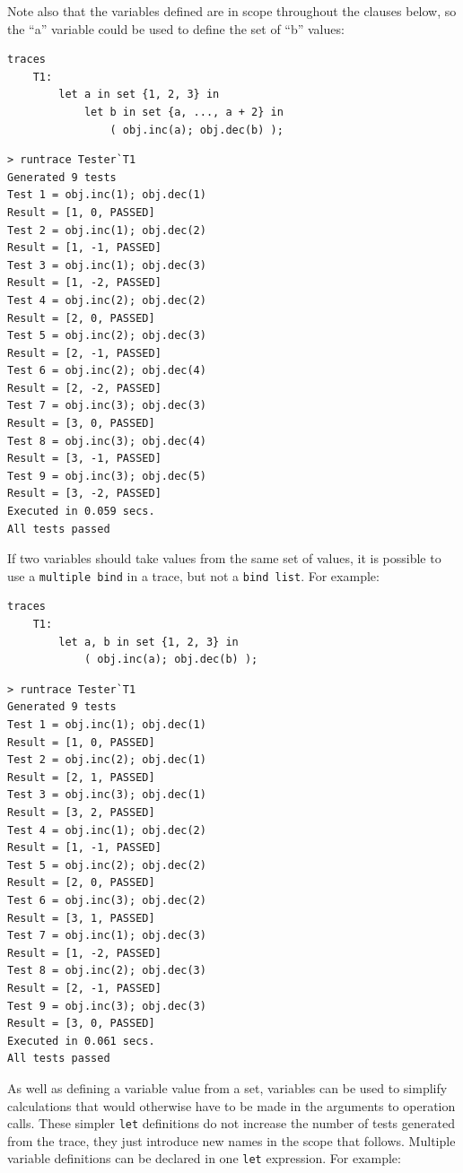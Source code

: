 \documentclass{overturerepchap}
\begin{document}
Note also that the variables defined are in scope
throughout the clauses below, so the ``a'' variable could be used to define the
set of ``b'' values:

\small
\begin{lstlisting}
traces
    T1:
        let a in set {1, 2, 3} in
            let b in set {a, ..., a + 2} in
                ( obj.inc(a); obj.dec(b) );
\end{lstlisting}

\begin{verbatim}
> runtrace Tester`T1
Generated 9 tests
Test 1 = obj.inc(1); obj.dec(1)
Result = [1, 0, PASSED]
Test 2 = obj.inc(1); obj.dec(2)
Result = [1, -1, PASSED]
Test 3 = obj.inc(1); obj.dec(3)
Result = [1, -2, PASSED]
Test 4 = obj.inc(2); obj.dec(2)
Result = [2, 0, PASSED]
Test 5 = obj.inc(2); obj.dec(3)
Result = [2, -1, PASSED]
Test 6 = obj.inc(2); obj.dec(4)
Result = [2, -2, PASSED]
Test 7 = obj.inc(3); obj.dec(3)
Result = [3, 0, PASSED]
Test 8 = obj.inc(3); obj.dec(4)
Result = [3, -1, PASSED]
Test 9 = obj.inc(3); obj.dec(5)
Result = [3, -2, PASSED]
Executed in 0.059 secs. 
All tests passed
\end{verbatim}
\normalsize

If two variables should take values from the same set of values, it is possible
to use a \texttt{multiple bind} in a trace, but not a \texttt{bind list}. For
example:

\small
\begin{lstlisting}
traces
    T1:
        let a, b in set {1, 2, 3} in
            ( obj.inc(a); obj.dec(b) );
\end{lstlisting}

\begin{verbatim}
> runtrace Tester`T1
Generated 9 tests
Test 1 = obj.inc(1); obj.dec(1)
Result = [1, 0, PASSED]
Test 2 = obj.inc(2); obj.dec(1)
Result = [2, 1, PASSED]
Test 3 = obj.inc(3); obj.dec(1)
Result = [3, 2, PASSED]
Test 4 = obj.inc(1); obj.dec(2)
Result = [1, -1, PASSED]
Test 5 = obj.inc(2); obj.dec(2)
Result = [2, 0, PASSED]
Test 6 = obj.inc(3); obj.dec(2)
Result = [3, 1, PASSED]
Test 7 = obj.inc(1); obj.dec(3)
Result = [1, -2, PASSED]
Test 8 = obj.inc(2); obj.dec(3)
Result = [2, -1, PASSED]
Test 9 = obj.inc(3); obj.dec(3)
Result = [3, 0, PASSED]
Executed in 0.061 secs. 
All tests passed
\end{verbatim}
\normalsize


As well as defining a variable value from a set, variables can be used to
simplify calculations that would otherwise have to be made in the arguments to
operation calls. These simpler \texttt{let} definitions do not increase the
number of tests generated from the trace, they just introduce new names in the
scope that follows. Multiple variable definitions can be declared in 
one \texttt{let} expression. For example:
\end{document}
